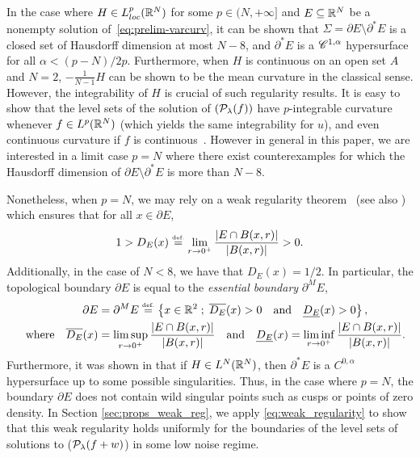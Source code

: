 In the case where $H\in L^p_{loc}(\mathbb{R}^N)$ for some $p\in (N,+\infty]$ and $E\subseteq \mathbb{R}^N$ be a nonempty solution of~\eqref{eq:prelim-varcurv}, it can be shown \cite{Ambrocorso} that $\Sigma=\partial E\setminus \partial^*E$ is a closed set of Hausdorff dimension at most $N-8$, and $\partial^* E$ is a $\mathscr{C}^{1,\alpha}$ hypersurface for all $\alpha<(p-N)/2p$. Furthermore, when $H$ is continuous on an open set $A$ and $N=2$, $-\frac{1}{N-1} H$ can be shown \cite[Th. 1.1.3]{Ambrocorso} to be the mean curvature in the classical sense.
However, the integrability of $H$ is crucial of such regularity results.
It is easy to show that the level sets of the solution of $(\mathcal{P}_\lambda(f))$ have
$p$-integrable curvature whenever $f\in L^p(\mathbb{R}^N)$ (which yields the
same integrability for $u$), and even continuous curvature if $f$ is continuous~\cite{casregul11}.
However in general in this paper,  we are interested in a limit case $p=N$ where there exist counterexamples \cite{massari1994variational,elisabetta2013sets} for which  the Hausdorff dimension of $\partial E\setminus \partial^*E$ is more than $N-8$.

Nonetheless, when $p=N$, we may rely on a weak regularity theorem~\cite[Th.~3.6]{massari1994variational} (see also \cite{gonzales1993boundaries}) which ensures that for all $x\in \partial E$,\begin{equation}\label{eq:weak_regularity}
  1>  D_E(x)\stackrel{\mbox{\upshape\tiny def.}}{=} \lim_{r\to 0^+} \frac{\left| E\cap B(x,r) \right|}{\left| B(x,r) \right|}>0.
\end{equation}
Additionally, in the case of $N<8$, we have that $D_E(x) = 1/2$.
In particular, the topological boundary $\partial E$ is equal to the \textit{essential boundary} $\partial^M E$,
\begin{align*}
  \partial E &= \partial^M E \stackrel{\mbox{\upshape\tiny def.}}{=} \left\{ x\in \mathbb{R}^2 \;;\; \overline{D_E}(x)>0 \quad \text{and} \quad \underline{D_E}(x)>0 \right\},\\
  \quad \text{where} \quad \overline{D_E}(x)&=\limsup_{r\to 0^+} \frac{\left| E\cap B(x,r) \right|}{\left| B(x,r) \right|} \quad \text{and} \quad \underline{D_E}(x)=\liminf_{r\to 0^+} \frac{\left| E\cap B(x,r) \right|}{\left| B(x,r) \right|}.
\end{align*}
Furthermore, it was shown in \cite{Paolini} that  if $H\in L^N(\mathbb{R}^N)$, then $\partial^* E$ is a $C^{0,\alpha}$ hypersurface up to some possible singularities.
Thus, in the case where $p=N$, the boundary $\partial E$ does not contain wild singular points such as cusps or points of zero density. In Section \ref{sec:props_weak_reg}, we apply \eqref{eq:weak_regularity} to show that this weak regularity holds uniformly for the boundaries of the level sets of solutions to ($\mathcal{P}_\lambda(f+w)$) in some low noise regime.




